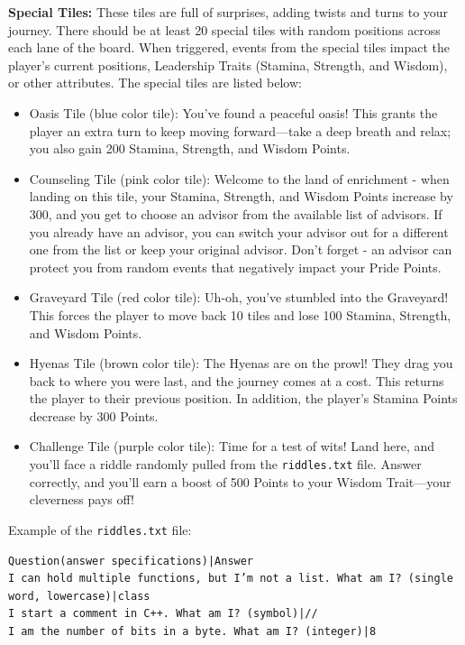 \textbf{Special Tiles:} These tiles are full of surprises, adding twists and turns to your journey. There should be at least 20 special tiles with random positions across each lane of the board. When triggered, events from the special tiles impact the player's current positions,  Leadership Traits (Stamina, Strength, and Wisdom), or other attributes. The special tiles are listed below: 
    \begin{itemize}
        \item Oasis Tile (blue color tile): You've found a peaceful oasis! This grants the player an extra turn to keep moving forward—take a deep breath and relax; you also gain 200 Stamina, Strength, and Wisdom Points.
        \item Counseling Tile (pink color tile): Welcome to the land of enrichment - when landing on this tile, your Stamina, Strength, and Wisdom Points increase by 300, and you get to choose an advisor from the available list of advisors. If you already have an advisor, you can switch your advisor out for a different one from the list or keep your original advisor. Don't forget - an advisor can protect you from random events that negatively impact your Pride Points.
        \item Graveyard Tile (red color tile): Uh-oh, you've stumbled into the Graveyard! This forces the player to move back 10 tiles and lose 100 Stamina, Strength, and Wisdom Points.
        \item Hyenas Tile (brown color tile): The Hyenas are on the prowl! They drag you back to where you were last, and the journey comes at a cost. This returns the player to their previous position. In addition, the player's Stamina Points decrease by 300 Points.
        \item Challenge Tile (purple color tile): Time for a test of wits! Land here, and you'll face a riddle randomly pulled from the \verb|riddles.txt| file.  Answer correctly, and you'll earn a boost of 500 Points to your Wisdom Trait—your cleverness pays off!
    \end{itemize}

Example of the \verb|riddles.txt| file:
\begin{verbatim}
Question(answer specifications)|Answer
I can hold multiple functions, but I’m not a list. What am I? (single word, lowercase)|class
I start a comment in C++. What am I? (symbol)|//
I am the number of bits in a byte. What am I? (integer)|8


\end{verbatim}

